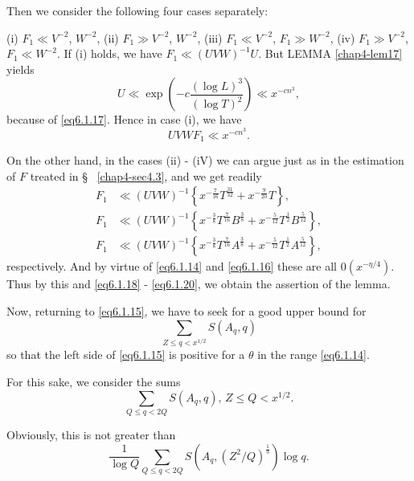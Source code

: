 Then we consider the following four cases separately:

\noindent 
(i) $F_1 \ll V^{-2}$, $W^{-2}$, (ii) $F_1 \gg V^{-2}$, $W^{-2}$, (iii)
$F_1 \ll V^{-2}$, $F_1 \gg W^{-2}$, (iv) $F_1 \gg V^{-2}$, $F_1 \ll
W^{-2}$. If (i) holds, we have $F_1 \ll (UVW)^{-1}U$. But LEMMA
\ref{chap4-lem17} yields 
$$
U \ll \exp\left(-c \frac{(\log L)^3}{(\log T )^2}\right) \ll x^{-cn^3},
$$
because of \eqref{eq6.1.17}. Hence in case (i), we have
\begin{equation*}
UVWF_1 \ll x^{-cn^3}. \tag{6.1.20}\label{eq6.1.20}
\end{equation*}

On the other hand, in the cases (ii) - (iV) we can argue just as in
the estimation of $F$ treated in \S~ \ref{chap4-sec4.3}, and we get readily 
\begin{align*}
  F_1 & \ll  (UVW)^{-1}  \left\{ x^{-\frac{7}{16}} T^{\frac{31}{32}} +
  x^{-\frac{9}{20}} T \right\}, \\ 
  F_1  & \ll  (UVW)^{-1}  \left\{ x^{-\frac{3}{8}}T^{\frac{7}{16}}
  B^{\frac{3}{8}} + x^{-\frac{5}{12}} T^{\frac{1}{2}}
  B^{\frac{5}{12}} \right\}, \\ 
  F_1  & \ll  (UVW)^{-1} \left\{ x^{-\frac{3}{8}} T^{\frac{7}{16}}
  A^{\frac{3}{8}} + x^{-\frac{5}{12}} T^{\frac{1}{2}} A^{\frac{5}{12}}
  \right\},  
\end{align*}
respectively. And by virtue of \eqref{eq6.1.14} and \eqref{eq6.1.16}
these are all $0(x^{-\eta/4})$. Thus by this and \eqref{eq6.1.18} -
\eqref{eq6.1.20}, we obtain the assertion of the lemma. 

Now, returning to \eqref{eq6.1.15}, we have to seek for a good upper bound for 
$$
 \sum_{Z \leq q < x^{1/2}} S (A_q, q)
$$\pageoriginale
so that the left side of \eqref{eq6.1.15} is positive for a $\theta$ in the
range \eqref{eq6.1.14}. 

For this sake, we consider the sums
$$
 \sum_{Q \leq q < 2Q}  S(A_q, q),\, Z \leq  Q < x^{1/2}.
$$

Obviously, this is not greater than
$$
\frac{1}{\log Q} \sum_{Q \leq q < 2Q}  S(A_q, (Z^2/Q)^{\frac{1}{3}})  \log q.
$$

